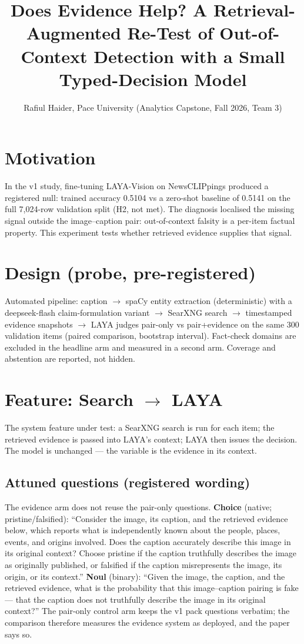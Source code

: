 \documentclass{article}
\title{Does Evidence Help? A Retrieval-Augmented Re-Test of Out-of-Context
Detection with a Small Typed-Decision Model}
\author{Rafiul Haider, Pace University (Analytics Capstone, Fall 2026, Team 3)}
\begin{document}
\maketitle
\section{Motivation}
In the v1 study, fine-tuning LAYA-Vision on NewsCLIPpings produced a registered null:
trained accuracy 0.5104 vs a zero-shot baseline of 0.5141 on the full 7,024-row
validation split (H2, not met). The diagnosis localised the missing signal outside
the image--caption pair: out-of-context falsity is a per-item factual property.
This experiment tests whether retrieved evidence supplies that signal.
\section{Design (probe, pre-registered)}
Automated pipeline: caption $\rightarrow$ spaCy entity extraction (deterministic)
with a deepseek-flash claim-formulation variant $\rightarrow$ SearXNG search
$\rightarrow$ timestamped evidence snapshots $\rightarrow$ LAYA judges pair-only vs
pair+evidence on the same 300 validation items (paired comparison, bootstrap
interval). Fact-check domains are excluded in the headline arm and measured in a
second arm. Coverage and abstention are reported, not hidden.

\section{Feature: Search $\rightarrow$ LAYA}
The system feature under test: a SearXNG search is run for each item; the retrieved
evidence is passed into LAYA's context; LAYA then issues the decision. The model is
unchanged --- the variable is the evidence in its context.
\subsection{Attuned questions (registered wording)}
The evidence arm does not reuse the pair-only questions. \textbf{Choice} (native;
pristine/falsified): ``Consider the image, its caption, and the retrieved evidence
below, which reports what is independently known about the people, places, events,
and origins involved. Does the caption accurately describe this image in its
original context? Choose pristine if the caption truthfully describes the image as
originally published, or falsified if the caption misrepresents the image, its
origin, or its context.'' \textbf{Noul} (binary): ``Given the image, the caption,
and the retrieved evidence, what is the probability that this image--caption
pairing is fake --- that the caption does not truthfully describe the image in its
original context?'' The pair-only control arm keeps the v1 pack questions verbatim;
the comparison therefore measures the evidence system as deployed, and the paper
says so.
\end{document}
